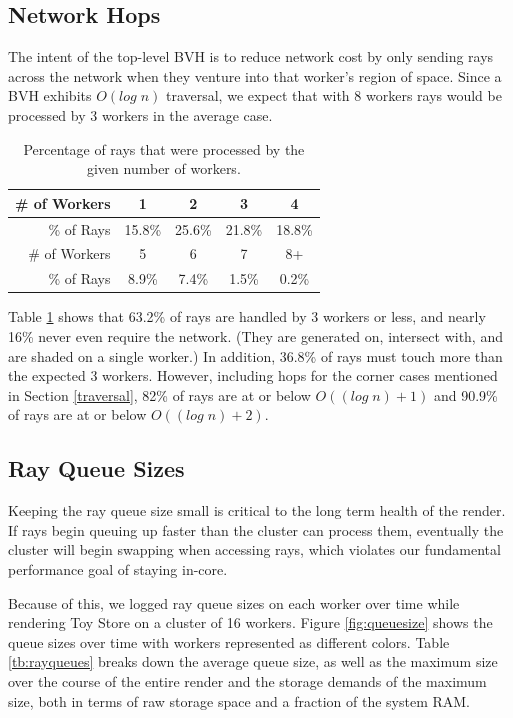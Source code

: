 \documentclass[a4paper,twoside]{article}
\begin{document}
\subsection{Network Hops}
\label{networkhops}

The intent of the top-level BVH is to reduce network cost by only sending rays
across the network when they venture into that worker's region of space.
Since a BVH exhibits $O(log\;n)$ traversal, we expect that with 8 workers rays
would be processed by 3 workers in the average case.

\begin{table}
\begin{center}
\begin{tabular}{|r||c|c|c|c|}
    \hline
    \# of Workers& 1 & 2 & 3 & 4 \\
    \hline
    \% of Rays & 15.8\% & 25.6\% & 21.8\% & 18.8\% \\
    \hline
    \hline
    \# of Workers & 5 & 6 & 7 & 8+ \\
    \hline
    \% of Rays & 8.9\% & 7.4\% & 1.5\% & 0.2\% \\
    \hline
\end{tabular}
\caption{Percentage of rays that were processed by the given number of workers.}
\label{tb:nethopspercent}
\end{center}
\end{table}

Table \ref{tb:nethopspercent} shows that 63.2\% of rays are handled by 3 workers
or less, and nearly 16\% never even require the network. (They are generated on,
intersect with, and are shaded on a single worker.) In addition, 36.8\% of
rays must touch more than the expected 3 workers. However, including hops for
the corner cases mentioned in Section \ref{traversal}, 82\% of rays are at
or below $O((log\;n) + 1)$ and 90.9\% of rays are at or below $O((log\;n) + 2)$.

\subsection{Ray Queue Sizes}
\label{queuesizes}

Keeping the ray queue size small is critical to the long term health of the
render. If rays begin queuing up faster than the cluster can process them,
eventually the cluster will begin swapping when accessing rays, which violates
our fundamental performance goal of staying in-core.

Because of this, we logged ray queue sizes on each worker over time while
rendering Toy Store on a cluster of 16 workers. Figure \ref{fig:queuesize}
shows the queue sizes over time with workers represented as different colors.
Table \ref{tb:rayqueues} breaks down the average queue size, as well as the
maximum size over the course of the entire render and the storage demands of the
maximum size, both in terms of raw storage space and a fraction of the system
RAM.
\end{document}
